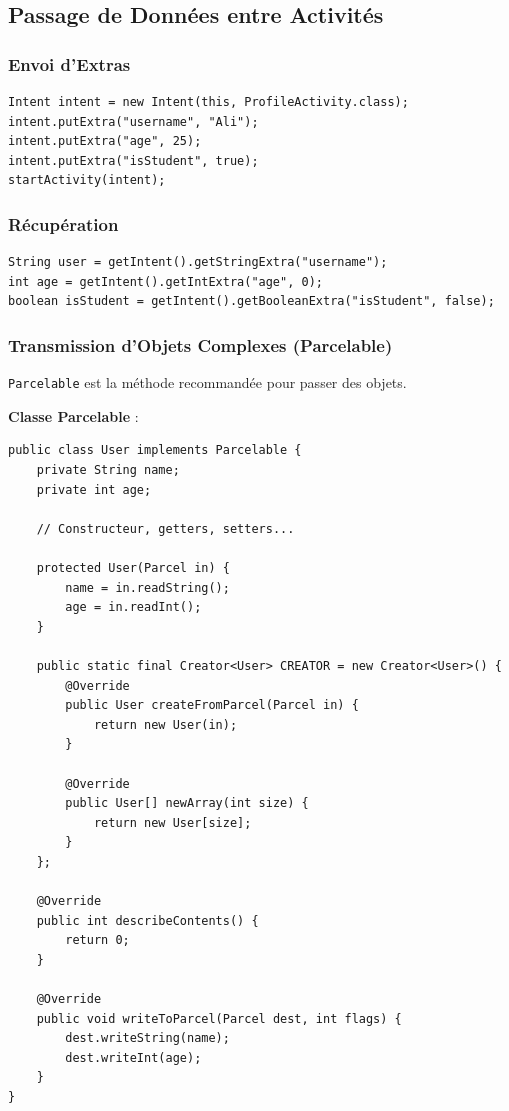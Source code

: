 \documentclass[11pt,a4paper]{article}
\begin{document}
\subsection{Passage de Données entre Activités}

\subsubsection{Envoi d'Extras}

\begin{lstlisting}
Intent intent = new Intent(this, ProfileActivity.class);
intent.putExtra("username", "Ali");
intent.putExtra("age", 25);
intent.putExtra("isStudent", true);
startActivity(intent);
\end{lstlisting}

\subsubsection{Récupération}

\begin{lstlisting}
String user = getIntent().getStringExtra("username");
int age = getIntent().getIntExtra("age", 0);
boolean isStudent = getIntent().getBooleanExtra("isStudent", false);
\end{lstlisting}

\subsubsection{Transmission d'Objets Complexes (Parcelable)}

\texttt{Parcelable} est la méthode recommandée pour passer des objets.

\textbf{Classe Parcelable} :
\begin{lstlisting}
public class User implements Parcelable {
    private String name;
    private int age;
    
    // Constructeur, getters, setters...
    
    protected User(Parcel in) {
        name = in.readString();
        age = in.readInt();
    }
    
    public static final Creator<User> CREATOR = new Creator<User>() {
        @Override
        public User createFromParcel(Parcel in) {
            return new User(in);
        }
        
        @Override
        public User[] newArray(int size) {
            return new User[size];
        }
    };
    
    @Override
    public int describeContents() {
        return 0;
    }
    
    @Override
    public void writeToParcel(Parcel dest, int flags) {
        dest.writeString(name);
        dest.writeInt(age);
    }
}
\end{lstlisting}
\end{document}
